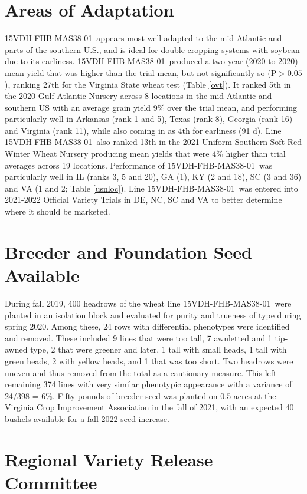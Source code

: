 \documentclass[12pt, letterpaper]{article}
\newcommand{\lin}{15VDH-FHB-MAS38-01~}
\begin{document}
\section{Areas of Adaptation}
 
\lin appears most well adapted to the mid-Atlantic and parts of the southern U.S., and is ideal for double-cropping systems with soybean due to its earliness. \lin produced a two-year (2020 to 2020) mean yield that was higher than the trial mean, but not significantly so (P$>0.05$), ranking 27th for the Virginia State wheat test (Table \ref{ovt}). It ranked 5th in the 2020 Gulf Atlantic Nursery across 8 locations in the mid-Atlantic and southern US with an average grain yield 9\% over the trial mean, and performing particularly well in Arkansas (rank 1 and 5), Texas (rank 8), Georgia (rank 16) and Virginia (rank 11), while also coming in as 4th for earliness (91 d). Line \lin also ranked 13th in the 2021 Uniform Southern Soft Red Winter Wheat Nursery producing mean yields that were 4\% higher than trial averages across 19 locations. Performance of \lin was particularly well in IL (ranks 3, 5 and 20), GA (1), KY (2 and 18), SC (3 and 36) and VA (1 and 2; Table \ref{usnloc}).  Line \lin was entered into 2021-2022 Official Variety Trials in DE, NC, SC and VA to better determine where it should be marketed. 

\section{Breeder and Foundation Seed Available}

During fall 2019, 400 headrows of the wheat line \lin were planted in an isolation block and evaluated for purity and trueness of type during spring 2020. Among these, 24 rows with differential phenotypes were identified and removed. These included 9 lines that were too tall, 7 awnletted and 1 tip-awned type, 2 that were greener and later, 1 tall with small heads, 1 tall with green heads, 2 with yellow heads, and 1 that was too short. Two headrows were uneven and thus removed from the total as a cautionary measure. This left remaining 374 lines with very similar phenotypic appearance with a variance of 24/398 = 6\%. Fifty pounds of breeder seed was planted on 0.5 acres at the Virginia Crop Improvement Association in the fall of 2021, with an expected 40 bushels available for a fall 2022 seed increase. 


\section{Regional Variety Release Committee}
\end{document}
